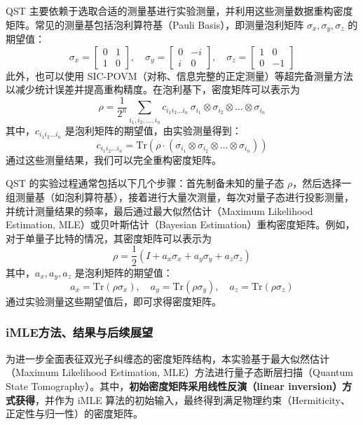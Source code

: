 QST 主要依赖于选取合适的测量基进行实验测量，并利用这些测量数据重构密度矩阵。常见的测量基包括泡利算符基（Pauli Basis），即测量泡利矩阵 \( \sigma_x, \sigma_y, \sigma_z \) 的期望值：  
\[
\sigma_x = \begin{bmatrix} 0 & 1 \\ 1 & 0 \end{bmatrix}, \quad
\sigma_y = \begin{bmatrix} 0 & -i \\ i & 0 \end{bmatrix}, \quad
\sigma_z = \begin{bmatrix} 1 & 0 \\ 0 & -1 \end{bmatrix}
\]  
此外，也可以使用 SIC-POVM（对称、信息完整的正定测量）等超完备测量方法以减少统计误差并提高重构精度。在泡利基下，密度矩阵可以表示为  
\[
\rho = \frac{1}{2^n} \sum_{i_1, i_2, ..., i_n} c_{i_1 i_2 ... i_n} \, \sigma_{i_1} \otimes \sigma_{i_2} \otimes ... \otimes \sigma_{i_n}
\]  
其中，\( c_{i_1 i_2 ... i_n} \) 是泡利矩阵的期望值，由实验测量得到：  
\[
c_{i_1 i_2 ... i_n} = \text{Tr}(\rho \cdot (\sigma_{i_1} \otimes \sigma_{i_2} \otimes ... \otimes \sigma_{i_n}))
\]  
通过这些测量结果，我们可以完全重构密度矩阵。  

QST 的实验过程通常包括以下几个步骤：首先制备未知的量子态 \( \rho \)，然后选择一组测量基（如泡利算符基），接着进行大量次测量，每次对量子态进行投影测量，并统计测量结果的频率，最后通过最大似然估计（Maximum Likelihood Estimation, MLE）或贝叶斯估计（Bayesian Estimation）重构密度矩阵。例如，对于单量子比特的情况，其密度矩阵可以表示为  
\[
\rho = \frac{1}{2} (I + a_x \sigma_x + a_y \sigma_y + a_z \sigma_z)
\]  
其中，\( a_x, a_y, a_z \) 是泡利矩阵的期望值：  
\[
a_x = \text{Tr}(\rho \sigma_x), \quad a_y = \text{Tr}(\rho \sigma_y), \quad a_z = \text{Tr}(\rho \sigma_z)
\]  
通过实验测量这些期望值后，即可求得密度矩阵。  

\subsubsection{iMLE方法、结果与后续展望}
为进一步全面表征双光子纠缠态的密度矩阵结构，本实验基于最大似然估计（Maximum Likelihood Estimation, MLE）方法进行量子态断层扫描（Quantum State Tomography）。其中，\textbf{初始密度矩阵采用线性反演（linear inversion）方式获得}，并作为 iMLE 算法的初始输入，最终得到满足物理约束（Hermiticity、正定性与归一性）的密度矩阵。

